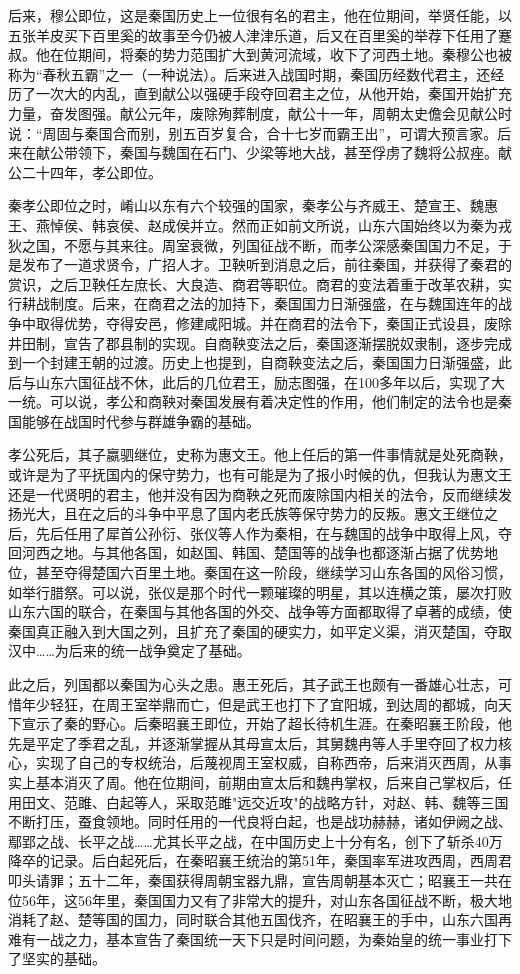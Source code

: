 \documentclass[12pt,a4paper]{ctexart}
\begin{document}
后来，穆公即位，这是秦国历史上一位很有名的君主，他在位期间，举贤任能，以五张羊皮买下百里奚的故事至今仍被人津津乐道，后又在百里奚的举荐下任用了蹇叔。他在位期间，将秦的势力范围扩大到黄河流域，收下了河西土地。秦穆公也被称为“春秋五霸”之一（一种说法）。后来进入战国时期，秦国历经数代君主，还经历了一次大的内乱，直到献公以强硬手段夺回君主之位，从他开始，秦国开始扩充力量，奋发图强。献公元年，废除殉葬制度，献公十一年，周朝太史儋会见献公时说：“周固与秦国合而别，别五百岁复合，合十七岁而霸王出”，可谓大预言家。后来在献公带领下，秦国与魏国在石门、少梁等地大战，甚至俘虏了魏将公叔痤。献公二十四年，孝公即位。

秦孝公即位之时，崤山以东有六个较强的国家，秦孝公与齐威王、楚宣王、魏惠王、燕悼侯、韩哀侯、赵成侯并立。然而正如前文所说，山东六国始终以为秦为戎狄之国，不愿与其来往。周室衰微，列国征战不断，而孝公深感秦国国力不足，于是发布了一道求贤令，广招人才。卫鞅听到消息之后，前往秦国，并获得了秦君的赏识，之后卫鞅任左庶长、大良造、商君等职位。商君的变法着重于改革农耕，实行耕战制度。后来，在商君之法的加持下，秦国国力日渐强盛，在与魏国连年的战争中取得优势，夺得安邑，修建咸阳城。并在商君的法令下，秦国正式设县，废除井田制，宣告了郡县制的实现。自商鞅变法之后，秦国逐渐摆脱奴隶制，逐步完成到一个封建王朝的过渡。历史上也提到，自商鞅变法之后，秦国国力日渐强盛，此后与山东六国征战不休，此后的几位君王，励志图强，在100多年以后，实现了大一统。可以说，孝公和商鞅对秦国发展有着决定性的作用，他们制定的法令也是秦国能够在战国时代参与群雄争霸的基础。

孝公死后，其子嬴驷继位，史称为惠文王。他上任后的第一件事情就是处死商鞅，或许是为了平抚国内的保守势力，也有可能是为了报小时候的仇，但我认为惠文王还是一代贤明的君主，他并没有因为商鞅之死而废除国内相关的法令，反而继续发扬光大，且在之后的斗争中平息了国内老氏族等保守势力的反叛。惠文王继位之后，先后任用了犀首公孙衍、张仪等人作为秦相，在与魏国的战争中取得上风，夺回河西之地。与其他各国，如赵国、韩国、楚国等的战争也都逐渐占据了优势地位，甚至夺得楚国六百里土地。秦国在这一阶段，继续学习山东各国的风俗习惯，如举行腊祭。可以说，张仪是那个时代一颗璀璨的明星，其以连横之策，屡次打败山东六国的联合，在秦国与其他各国的外交、战争等方面都取得了卓著的成绩，使秦国真正融入到大国之列，且扩充了秦国的硬实力，如平定义渠，消灭楚国，夺取汉中……为后来的统一战争奠定了基础。

此之后，列国都以秦国为心头之患。惠王死后，其子武王也颇有一番雄心壮志，可惜年少轻狂，在周王室举鼎而亡，但是武王也打下了宜阳城，到达周的都城，向天下宣示了秦的野心。后秦昭襄王即位，开始了超长待机生涯。在秦昭襄王阶段，他先是平定了季君之乱，并逐渐掌握从其母宣太后，其舅魏冉等人手里夺回了权力核心，实现了自己的专权统治，后蔑视周王室权威，自称西帝，后来消灭西周，从事实上基本消灭了周。他在位期间，前期由宣太后和魏冉掌权，后来自己掌权后，任用田文、范雎、白起等人，采取范雎"远交近攻"的战略方针，对赵、韩、魏等三国不断打压，蚕食领地。同时任用的一代良将白起，也是战功赫赫，诸如伊阙之战、鄢郢之战、长平之战……尤其长平之战，在中国历史上十分有名，创下了斩杀40万降卒的记录。后白起死后，在秦昭襄王统治的第51年，秦国率军进攻西周，西周君叩头请罪；五十二年，秦国获得周朝宝器九鼎，宣告周朝基本灭亡；昭襄王一共在位56年，这56年里，秦国国力又有了非常大的提升，对山东各国征战不断，极大地消耗了赵、楚等国的国力，同时联合其他五国伐齐，在昭襄王的手中，山东六国再难有一战之力，基本宣告了秦国统一天下只是时间问题，为秦始皇的统一事业打下了坚实的基础。
\end{document}
